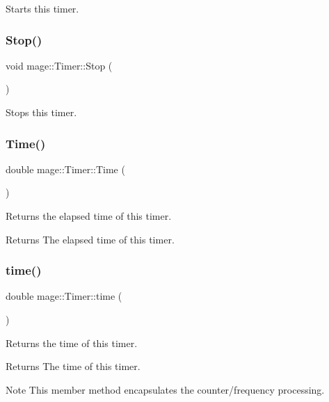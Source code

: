 Starts this timer. \hypertarget{classmage_1_1_timer_abf234f1e2ee9e760f316bd49500d5a3a}{}\label{classmage_1_1_timer_abf234f1e2ee9e760f316bd49500d5a3a} 
\subsubsection{\texorpdfstring{Stop()}{Stop()}}
{\footnotesize\ttfamily void mage\+::\+Timer\+::\+Stop (\begin{DoxyParamCaption}{ }\end{DoxyParamCaption})}

Stops this timer. \hypertarget{classmage_1_1_timer_a5e4655ac296cc8971b54e5a76082f00f}{}\label{classmage_1_1_timer_a5e4655ac296cc8971b54e5a76082f00f} 
\subsubsection{\texorpdfstring{Time()}{Time()}}
{\footnotesize\ttfamily double mage\+::\+Timer\+::\+Time (\begin{DoxyParamCaption}{ }\end{DoxyParamCaption})}

Returns the elapsed time of this timer.

\begin{DoxyReturn}{Returns}
The elapsed time of this timer. 
\end{DoxyReturn}
\hypertarget{classmage_1_1_timer_a782882e9dbe9a2843b5203ba13309b23}{}\label{classmage_1_1_timer_a782882e9dbe9a2843b5203ba13309b23} 
\subsubsection{\texorpdfstring{time()}{time()}}
{\footnotesize\ttfamily double mage\+::\+Timer\+::time (\begin{DoxyParamCaption}{ }\end{DoxyParamCaption})\hspace{0.3cm}{\ttfamily [protected]}}

Returns the time of this timer.

\begin{DoxyReturn}{Returns}
The time of this timer. 
\end{DoxyReturn}
\begin{DoxyNote}{Note}
This member method encapsulates the counter/frequency processing. 
\end{DoxyNote}


